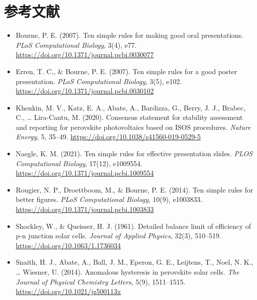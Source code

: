 \section*{参考文献}

\begin{itemize}
\item Bourne, P. E. (2007). Ten simple rules for making good oral presentations. \textit{PLoS Computational Biology}, 3(4), e77. \url{https://doi.org/10.1371/journal.pcbi.0030077}
\item Erren, T. C., \& Bourne, P. E. (2007). Ten simple rules for a good poster presentation. \textit{PLoS Computational Biology}, 3(5), e102. \url{https://doi.org/10.1371/journal.pcbi.0030102}
\item Khenkin, M. V., Katz, E. A., Abate, A., Bardizza, G., Berry, J. J., Brabec, C., \ldots{} Lira-Cantu, M. (2020). Consensus statement for stability assessment and reporting for perovskite photovoltaics based on ISOS procedures. \textit{Nature Energy}, 5, 35--49. \url{https://doi.org/10.1038/s41560-019-0529-5}
\item Naegle, K. M. (2021). Ten simple rules for effective presentation slides. \textit{PLOS Computational Biology}, 17(12), e1009554. \url{https://doi.org/10.1371/journal.pcbi.1009554}
\item Rougier, N. P., Droettboom, M., \& Bourne, P. E. (2014). Ten simple rules for better figures. \textit{PLoS Computational Biology}, 10(9), e1003833. \url{https://doi.org/10.1371/journal.pcbi.1003833}
\item Shockley, W., \& Queisser, H. J. (1961). Detailed balance limit of efficiency of p-n junction solar cells. \textit{Journal of Applied Physics}, 32(3), 510--519. \url{https://doi.org/10.1063/1.1736034}
\item Snaith, H. J., Abate, A., Ball, J. M., Eperon, G. E., Leijtens, T., Noel, N. K., \ldots{} Wiesner, U. (2014). Anomalous hysteresis in perovskite solar cells. \textit{The Journal of Physical Chemistry Letters}, 5(9), 1511--1515. \url{https://doi.org/10.1021/jz500113x}
\end{itemize}
